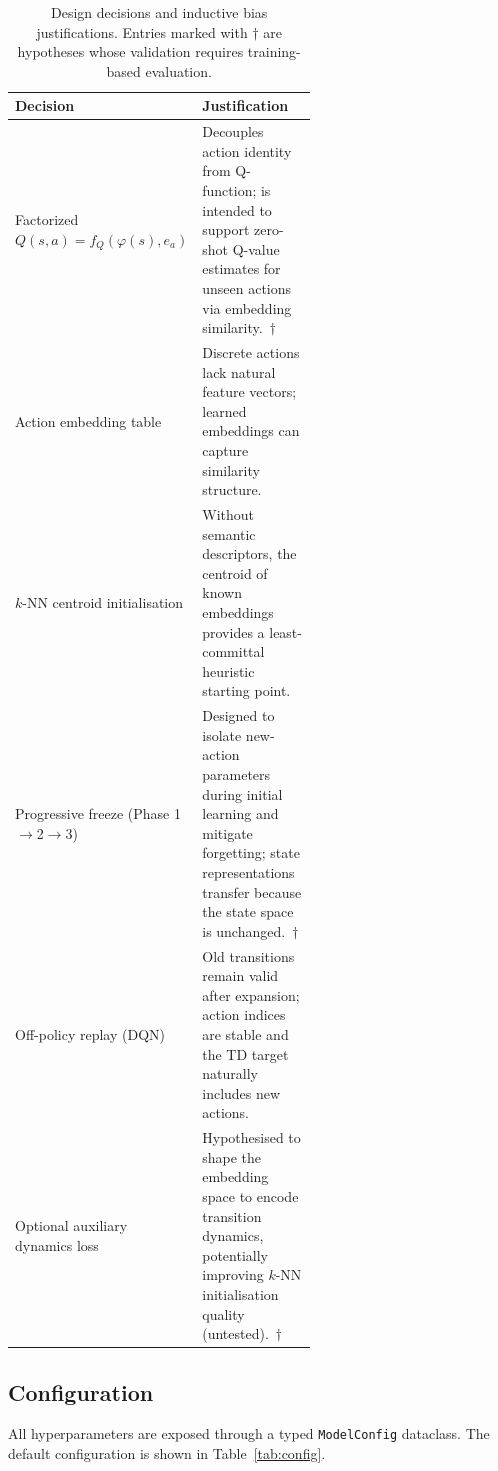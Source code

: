 \documentclass{article}
\begin{document}
\begin{table}[h]
  \centering
  \caption{Design decisions and inductive bias justifications. Entries marked
  with $\dagger$ are hypotheses whose validation requires training-based
  evaluation.}
  \label{tab:design}
  \begin{tabular}{lp{0.6\linewidth}}
    \toprule
    \textbf{Decision} & \textbf{Justification} \\
    \midrule
    Factorized $Q(s,a)=f_Q(\varphi(s),e_a)$ &
    Decouples action identity from Q-function; is intended to support zero-shot
    Q-value estimates for unseen actions via embedding
    similarity.\ $\dagger$ \\
    \addlinespace
    Action embedding table &
    Discrete actions lack natural feature vectors; learned embeddings can
    capture similarity structure. \\
    \addlinespace
    $k$-NN centroid initialisation &
    Without semantic descriptors, the centroid of known embeddings provides a
    least-committal heuristic starting point. \\
    \addlinespace
    Progressive freeze (Phase 1$\to$2$\to$3) &
    Designed to isolate new-action parameters during initial learning and
    mitigate forgetting; state representations transfer because the state
    space is unchanged.\ $\dagger$ \\
    \addlinespace
    Off-policy replay (DQN) &
    Old transitions remain valid after expansion; action indices are stable
    and the TD target naturally includes new actions. \\
    \addlinespace
    Optional auxiliary dynamics loss &
    Hypothesised to shape the embedding space to encode transition dynamics,
    potentially improving $k$-NN initialisation quality (untested).\ $\dagger$ \\
    \bottomrule
  \end{tabular}
\end{table}

\subsection{Configuration}

All hyperparameters are exposed through a typed \texttt{ModelConfig} dataclass.
The default configuration is shown in Table~\ref{tab:config}.
\end{document}

